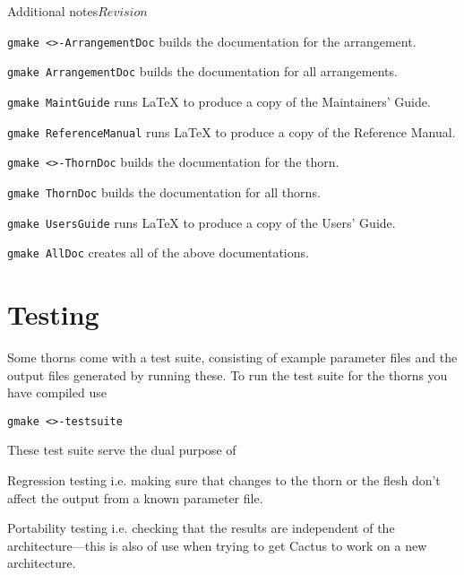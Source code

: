 \begin{cactuspart}{Additional notes}{}{$Revision$}
\begin{Lentry}

\item[\texttt{gmake <\var{arrangement}>-ArrangementDoc}] builds the
documentation for the arrangement.

\item[\texttt{gmake ArrangementDoc}] builds the documentation for all
arrangements.

\item [\texttt{gmake MaintGuide}] runs LaTeX to produce a copy of the
Maintainers' Guide.

\item [\texttt{gmake ReferenceManual}] runs LaTeX to produce a copy of the
Reference Manual.

\item[\texttt{gmake <\var{thorn}>-ThornDoc}] builds the documentation for the
thorn.

\item[\texttt{gmake ThornDoc}] builds the documentation for all thorns.

\item [\texttt{gmake UsersGuide}] runs LaTeX to produce a copy of the Users'
Guide.

\item [\texttt{gmake AllDoc}] creates all of the above documentations.

\end{Lentry}


\section{Testing}
\label{sec:testing}

Some thorns come with a test suite, consisting of example parameter files
and the output files generated by running these. To run the test suite
for the thorns you have compiled use

\texttt{gmake <>-testsuite}

These test suite serve the dual purpose of

\begin{Lentry}
\item [Regression testing]
i.e. making sure that changes to the thorn or the flesh don't affect the
output from a known parameter file.
\item [Portability testing]
i.e. checking that the results are independent of the architecture---this
is also of use when trying to get Cactus to work on a new architecture.
\end{Lentry}


\end{cactuspart}
